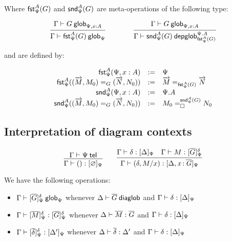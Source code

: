 Where $\fsttelglob{\Psi}{A}{G}$ and $\sndtelglob{\Psi}{A}{G}$ are
meta-operations of the following type:

\begin{small}
  \[
  \infer{\wfglob{\Gamma}{\fsttelglob{\Psi}{A}{G}}{\Psi}}
  {\wfglob{\Gamma}{G}{\Psi,x:A}}
  \qquad\qquad
  \infer{\wfdepglob{\Gamma}{\sndtelglob{\Psi}{A}{G}}{\Psi.A}
    {\fsttelglob{\Psi}{A}{G}}}
  {\wfglob{\Gamma}{G}{\Psi,x:A}}\]
\end{small}

and are defined by:

\begin{small}
  \[
  \begin{array}{rcl}
    \fsttelglob{\Psi}{A}{\Psi,x:A} & := & \Psi \\
    \fsttelglob{\Psi}{A}{\homj{G}{(\tel{M},M_0)}{(\tel{N},N_0)}} & := &
    \homj{\fsttelglob{\Psi}{A}{G}}{\tel{M}}{\tel{N}} \\
    \sndtelglob{\Psi}{A}{\Psi,x:A} & := & \Psi.A \\
    \sndtelglob{\Psi}{A}{\homj{G}{(\tel{M},M_0)}{(\tel{N},N_0)}} & := &
    \dhomj{\sndtelglob{\Psi}{A}{G}}{M_0}{N_0}{\blank}
    \\
  \end{array}
  \]
\end{small}

\subsection{Interpretation of diagram contexts}

\begin{small}
\[\infer
    {\ofinterp{\Gamma}{()}{\emptyctx}{\Psi}}
    {\wftel{\Gamma}{\Psi}}
  \qquad
  \infer
    {\ofinterp{\Gamma}{(\delta,M/x)}{\Delta,\tptm{x}{\diag G}}{\Psi}}
    {\ofinterp{\Gamma}{\delta}{\Delta}{\Psi}
    &\ofglob{\Gamma}{M}{\interpglob{\diag G}{\Psi}{\delta}}}
\]
\end{small}

We have the following operations:
\begin{itemize}
\item $\wfglob{\Gamma}{\interpglob{\diag G}{\Psi}{\delta}}{\Psi}$ whenever
  $\wfdiaglob{\Delta}{\diag G}$ and $\ofinterp{\Gamma}{\delta}{\Delta}{\Psi}$
\item $\ofglob{\Gamma}{\interpglob{\diag M}{\Psi}{\delta}}{} {\interpglob{\diag
      G}{\Psi}{\delta}}$ whenever $\ofdiaglob{\Delta}{\diag M}{\diag G}$ and
  $\ofinterp{\Gamma}{\delta}{\Delta}{\Psi}$
\item $\ofinterp{\Gamma}{\interpglob{\diag\delta}{\Psi}{\delta}}{\Delta'}{\Psi}$
  whenever $\ofdiaglob{\Delta}{\diag\delta}{\Delta'}$ and
  $\ofinterp{\Gamma}{\delta}{\Delta}{\Psi}$
\end{itemize}

